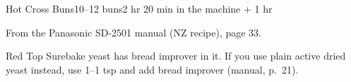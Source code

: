 \begin{recipebox}{Hot Cross Buns}{10--12 buns}{2 hr 20 min in the machine + 1 hr}
\begin{notelist}
  \item From the Panasonic SD-2501 manual (NZ recipe), page 33.
  \item Red Top Surebake yeast has bread improver in it. If you use plain active dried yeast instead, use 1--1 tsp and add bread improver (manual, p.~21).
\end{notelist}

\end{recipebox}
